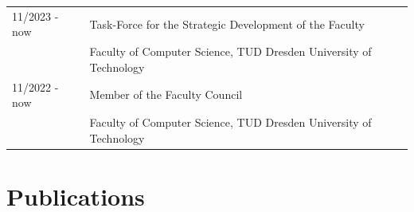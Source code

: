 \documentclass[11pt, a4paper, oneside]{article}
\begin{document}
\begin{tabular}{R{3cm} L{13cm}}
	11/2023 - now   	& Task-Force for the Strategic Development of the Faculty \\ 
									& Faculty of Computer Science, TUD Dresden University of Technology  \\
	11/2022 - now 	    & Member of the Faculty Council \\ 
									& Faculty of Computer Science, TUD Dresden University of Technology 
\end{tabular}


\section*{Publications}

\nocite{*} 

{}
\end{document}
